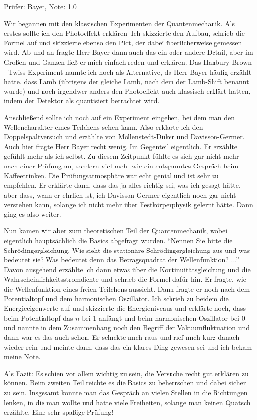 Prüfer: Bayer, Note: 1.0

Wir begannen mit den klassischen Experimenten der Quantenmechanik. Als erstes sollte ich den Photoeffekt erklären. 
Ich skizzierte den Aufbau, schrieb die Formel auf und skizzierte ebenso den Plot, der dabei überlicherweise gemessen wird.
Ab und an fragte Herr Bayer dann auch das ein oder andere Detail, aber im Großen und Ganzen ließ er mich einfach reden und erklären. 
Das Hanbury Brown - Twiss Experiment nannte ich noch als Alternative, da Herr Bayer häufig erzählt hatte, dass Lamb (übrigens der gleiche Lamb, nach dem der Lamb-Shift benannt wurde) und noch irgendwer anders den Photoeffekt auch klassisch erklärt hatten, indem der Detektor als quantisiert betrachtet wird. 

\noindent Anschließend sollte ich noch auf ein Experiment eingehen, bei dem man den Wellencharakter eines Teilchens sehen kann. Also erklärte ich den Doppelspaltversuch und erzählte von Möllenstedt-Düker und Davisson-Germer. Auch hier fragte Herr Bayer recht wenig. Im Gegenteil eigentlich. Er erzählte gefühlt mehr als ich selbst. Zu diesem Zeitpunkt fühlte es sich gar nicht mehr nach einer Prüfung an, sondern viel mehr wie ein entspanntes Gespräch beim Kaffeetrinken. Die Prüfungsatmosphäre war echt genial und ist sehr zu empfehlen. %
Er erklärte dann, dass das ja alles richtig sei, was ich gesagt hätte, aber dass, wenn er ehrlich ist, ich Davisson-Germer eigentlich noch gar nicht verstehen kann, solange ich nicht mehr über Festkörperphysik gelernt hätte. Dann ging es also weiter. 

\noindent Nun kamen wir aber zum theoretischen Teil der Quantenmechanik, wobei eigentlich hauptsächlich die Basics abgefragt wurden. \enquote{Nennen Sie bitte die Schrödingergleichung. Wie sieht die stationäre Schrödingergleichung aus und was bedeutet sie? Was bedeutet denn das Betragsquadrat der Wellenfunktion? ...} Davon ausgehend erzählte ich dann etwas über die Kontinuitätsgleichung und die Wahrscheinlichkeitsstromdichte und schrieb die Formel dafür hin. Er fragte, wie die Wellenfunktion eines freien Teilchens aussieht. Dann fragte er noch nach dem Potentialtopf und dem harmonischen Oszillator. Ich schrieb zu beidem die Energieeigenwerte auf und skizzierte die Energieniveaus und erklärte noch, dass beim Potentialtopf das $n$ bei \num{1} anfängt und beim harmonischen Oszillator bei \num{0} und nannte in dem Zusammenhang noch den Begriff der Vakuumfluktuation und dann war es das auch schon. Er schickte mich raus und rief mich kurz danach wieder rein und meinte dann, dass das ein klares Ding gewesen sei und ich bekam meine Note.

\noindent Als Fazit: Es schien vor allem wichtig zu sein, die Versuche recht gut erklären zu können. Beim zweiten Teil reichte es die Basics zu beherrschen und dabei sicher zu sein. Insgesamt konnte man das Gespräch an vielen Stellen in die Richtungen lenken, in die man wollte und hatte viele Freiheiten, solange man keinen Quatsch erzählte. Eine sehr spaßige Prüfung! 
